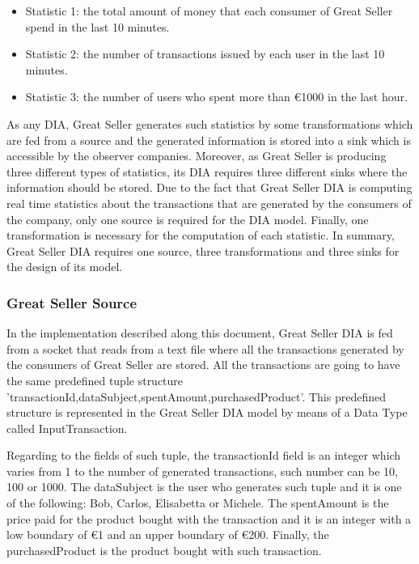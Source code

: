 \begin{itemize}

\item Statistic 1: the total amount of money that each consumer of Great Seller spend in the last 10 minutes.
\item Statistic 2: the number of transactions issued by each user in the last 10 minutes.
\item Statistic 3: the number of users who spent more than \euro{1000} in the last hour.

\end{itemize}

As any DIA, Great Seller generates such statistics by some transformations which are fed from a source and the generated information is stored into a sink which is accessible by the observer companies. Moreover, as Great Seller is producing three different types of statistics, its DIA requires three different sinks where the information should be stored. Due to the fact that Great Seller DIA is computing real time statistics about the transactions that are generated by the consumers of the company, only one source is required for the DIA model. Finally, one transformation is necessary for the computation of each statistic. In summary, Great Seller DIA requires one source, three transformations and three sinks for the design of its model.

\subsubsection*{Great Seller Source}
In the implementation described along this document, Great Seller DIA is fed from a socket that reads from a text file where all the transactions generated by the consumers of Great Seller are stored. All the transactions are going to have the same predefined tuple structure 'transactionId,dataSubject,spentAmount,purchasedProduct'. This predefined structure is represented in the Great Seller DIA model by means of a Data Type called InputTransaction.

Regarding to the fields of such tuple, the transactionId field is an integer which varies from 1 to the number of generated transactions, such number can be 10, 100 or 1000. The dataSubject is the user who generates such tuple and it is one of the following: Bob, Carlos, Elisabetta or Michele. The spentAmount is the price paid for the product bought with the transaction and it is an integer with a low boundary of \euro{1} and an upper boundary of \euro{200}. Finally, the purchasedProduct is the product bought with such transaction.

